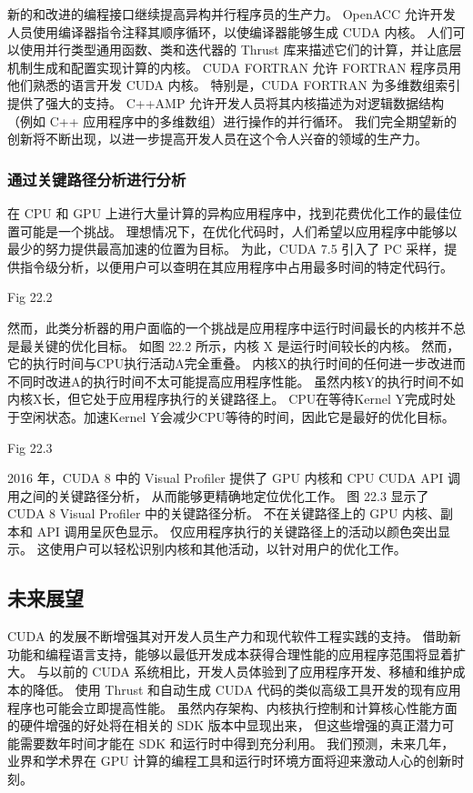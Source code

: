 新的和改进的编程接口继续提高异构并行程序员的生产力。 
OpenACC 允许开发人员使用编译器指令注释其顺序循环，以使编译器能够生成 CUDA 内核。 
人们可以使用并行类型通用函数、类和迭代器的 Thrust 库来描述它们的计算，并让底层机制生成和配置实现计算的内核。 
CUDA FORTRAN 允许 FORTRAN 程序员用他们熟悉的语言开发 CUDA 内核。 
特别是，CUDA FORTRAN 为多维数组索引提供了强大的支持。 
C++AMP 允许开发人员将其内核描述为对逻辑数据结构（例如 C++ 应用程序中的多维数组）进行操作的并行循环。 
我们完全期望新的创新将不断出现，以进一步提高开发人员在这个令人兴奋的领域的生产力。

\subsubsection{通过关键路径分析进行分析}
在 CPU 和 GPU 上进行大量计算的异构应用程序中，找到花费优化工作的最佳位置可能是一个挑战。 
理想情况下，在优化代码时，人们希望以应用程序中能够以最少的努力提供最高加速的位置为目标。 
为此，CUDA 7.5 引入了 PC 采样，提供指令级分析，以便用户可以查明在其应用程序中占用最多时间的特定代码行。

{\color{red} Fig 22.2}

然而，此类分析器的用户面临的一个挑战是应用程序中运行时间最长的内核并不总是最关键的优化目标。 
如图 22.2 所示，内核 X 是运行时间较长的内核。 然而，它的执行时间与CPU执行活动A完全重叠。
内核X的执行时间的任何进一步改进而不同时改进A的执行时间不太可能提高应用程序性能。 
虽然内核Y的执行时间不如内核X长，但它处于应用程序执行的关键路径上。 
CPU在等待Kernel Y完成时处于空闲状态。加速Kernel Y会减少CPU等待的时间，因此它是最好的优化目标。

{\color{red} Fig 22.3}

2016 年，CUDA 8 中的 Visual Profiler 提供了 GPU 内核和 CPU CUDA API 调用之间的关键路径分析，
从而能够更精确地定位优化工作。 图 22.3 显示了 CUDA 8 Visual Profiler 中的关键路径分析。 
不在关键路径上的 GPU 内核、副本和 API 调用呈灰色显示。 仅应用程序执行的关键路径上的活动以颜色突出显示。 
这使用户可以轻松识别内核和其他活动，以针对用户的优化工作。

\subsection{未来展望}
CUDA 的发展不断增强其对开发人员生产力和现代软件工程实践的支持。 
借助新功能和编程语言支持，能够以最低开发成本获得合理性能的应用程序范围将显着扩大。 
与以前的 CUDA 系统相比，开发人员体验到了应用程序开发、移植和维护成本的降低。 
使用 Thrust 和自动生成 CUDA 代码的类似高级工具开发的现有应用程序也可能会立即提高性能。 
虽然内存架构、内核执行控制和计算核心性能方面的硬件增强的好处将在相关的 SDK 版本中显现出来，
但这些增强的真正潜力可能需要数年时间才能在 SDK 和运行时中得到充分利用。 
我们预测，未来几年，业界和学术界在 GPU 计算的编程工具和运行时环境方面将迎来激动人心的创新时刻。